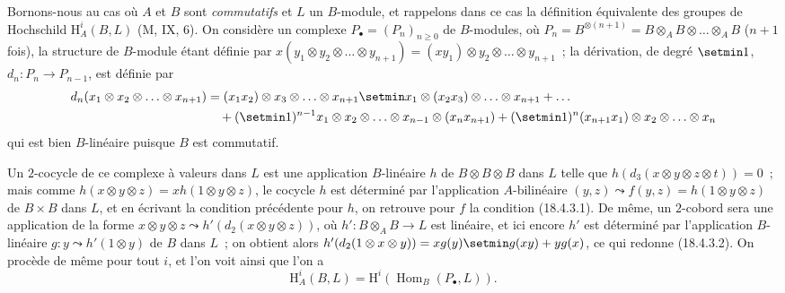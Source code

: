 \begin{env}[18.4.4]
\label{0.18.4.4-fr}
Bornons-nous au cas où $A$ et $B$ sont \emph{commutatifs} et $L$ un
$B$-module, et rappelons dans ce cas la définition équivalente des groupes de
Hochschild $\mathrm H_A^i(B,L)$ (M, IX, 6). On considère un complexe
$P_\bullet=(P_n)_{n\geqslant0}$ de $B$-modules, où
$P_n=B^{\otimes(n+1)}=B\otimes_A B\otimes\ldots\otimes_A B$
($n+1$ fois), la structure de $B$-module étant définie
par
$x(y_1\otimes y_2\otimes\ldots\otimes y_{n+1})=(xy_1)\otimes y_2\otimes\ldots\otimes y_{n+1}$~;
la dérivation, de degré $\setmin 1$, $d_n:P_n\to P_{n-1}$, est
définie par
\begin{align*}
  d_n(x_1\otimes x_2\otimes\ldots\otimes x_{n+1})
    &=(x_1x_2)\otimes x_3\otimes\ldots\otimes x_{n+1}
      \setmin x_1\otimes(x_2x_3)\otimes\ldots\otimes x_{n+1}+\ldots\\
    &\quad+(\setmin 1)^{n-1}x_1\otimes x_2\otimes\ldots\otimes x_{n-1}
      \otimes(x_nx_{n+1})
      +(\setmin 1)^n(x_{n+1}x_1)\otimes x_2\otimes\ldots\otimes x_n
\end{align*}
qui est bien $B$-linéaire puisque $B$ est commutatif.

Un $2$-cocycle de ce complexe à valeurs dans $L$ est une application
$B$-linéaire $h$ de $B\otimes B\otimes B$ dans $L$ telle que
$h(d_3(x\otimes y\otimes z\otimes t))=0$~; mais comme
$h(x\otimes y\otimes z)=xh(1\otimes y\otimes z)$, le cocycle $h$ est déterminé
par l'application $A$-bilinéaire
$(y,z)\leadsto f(y,z)=h(1\otimes y\otimes z)$ de $B\times B$ dans $L$, et
en écrivant la condition précédente pour $h$, on retrouve pour $f$ la
condition (18.4.3.1). De même, un $2$-cobord sera une application de la forme
$x\otimes y\otimes z\leadsto h'(d_2(x\otimes y\otimes z))$, où
$h':B\otimes_A B\to L$ est linéaire, et ici encore $h'$ est déterminé par
l'application $B$-linéaire $g:y\leadsto h'(1\otimes y)$ de $B$ dans $L$~;
on obtient alors
$h'(d_2(1\otimes x\otimes y))=xg(y)\setmin g(xy)+yg(x)$, ce qui redonne (18.4.3.2).
On procède de même pour tout $i$, et l'on voit ainsi que l'on a
\begin{equation}
\label{0.18.4.4.1-fr}
\tag{18.4.4.1}
  \mathrm H_A^i(B,L)=\mathrm H^i(\operatorname{Hom}_B(P_\bullet,L)).
\end{equation}
\end{env}

